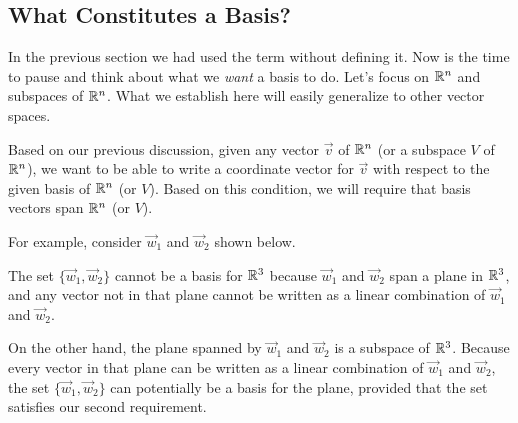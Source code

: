 \documentclass{ximera}
\begin{document}
\subsection*{What Constitutes a Basis?}

In the previous section we had used the term  without defining it.  Now is the time to pause and think about what we {\it want} a basis to do.  Let's focus on $\mathbb{R}^n$ and subspaces of $\mathbb{R}^n$.  What we establish here will easily generalize to other vector spaces.  

Based on our previous discussion, given any vector $\vec{v}$ of $\mathbb{R}^n$ (or a subspace $V$ of $\mathbb{R}^n$), we want to be able to write a coordinate vector for $\vec{v}$ with respect to the given basis of $\mathbb{R}^n$ (or $V$).  Based on this condition, we will require that basis vectors span $\mathbb{R}^n$ (or $V$).

For example, consider $\vec{w}_1$ and $\vec{w}_2$ shown below.  

\begin{center}
\end{center}
The set $\{\vec{w}_1, \vec{w}_2\}$ cannot be a basis for $\mathbb{R}^3$ because $\vec{w}_1$ and $\vec{w}_2$ span a plane in $\mathbb{R}^3$, and any vector not in that plane cannot be written as a linear combination of $\vec{w}_1$ and $\vec{w}_2$.

On the other hand, the plane spanned by $\vec{w}_1$ and $\vec{w}_2$ is a subspace of $\mathbb{R}^3$.  Because every vector in that plane can be written as a linear combination of $\vec{w}_1$ and $\vec{w}_2$, the set $\{\vec{w}_1, \vec{w}_2\}$ can potentially be a basis for the plane, provided that the set satisfies our second requirement.
\end{document}
